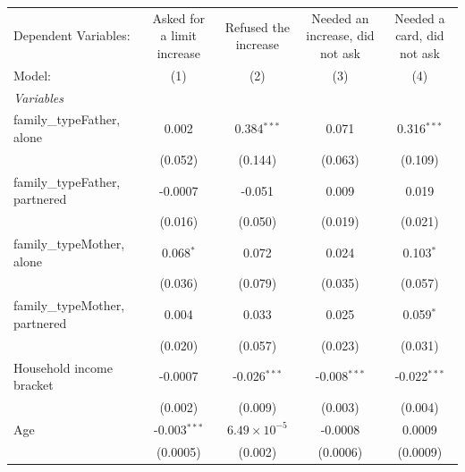 
\begingroup
\centering
\begin{tabular}{lcccc}
   \tabularnewline \midrule \midrule
   Dependent Variables:           & Asked for a limit increase & Refused the increase  & Needed an increase, did not ask & Needed a card, did not ask\\  
   Model:                         & (1)                        & (2)                   & (3)                             & (4)\\  
   \midrule
   \emph{Variables}\\
   family\_typeFather, alone      & 0.002                      & 0.384$^{***}$         & 0.071                           & 0.316$^{***}$\\   
                                  & (0.052)                    & (0.144)               & (0.063)                         & (0.109)\\   
   family\_typeFather, partnered  & -0.0007                    & -0.051                & 0.009                           & 0.019\\   
                                  & (0.016)                    & (0.050)               & (0.019)                         & (0.021)\\   
   family\_typeMother, alone      & 0.068$^{*}$                & 0.072                 & 0.024                           & 0.103$^{*}$\\   
                                  & (0.036)                    & (0.079)               & (0.035)                         & (0.057)\\   
   family\_typeMother, partnered  & 0.004                      & 0.033                 & 0.025                           & 0.059$^{*}$\\   
                                  & (0.020)                    & (0.057)               & (0.023)                         & (0.031)\\   
   Household income bracket       & -0.0007                    & -0.026$^{***}$        & -0.008$^{***}$                  & -0.022$^{***}$\\   
                                  & (0.002)                    & (0.009)               & (0.003)                         & (0.004)\\   
   Age                            & -0.003$^{***}$             & $6.49\times 10^{-5}$  & -0.0008                         & 0.0009\\   
                                  & (0.0005)                   & (0.002)               & (0.0006)                        & (0.0009)\\   

\end{tabular}
